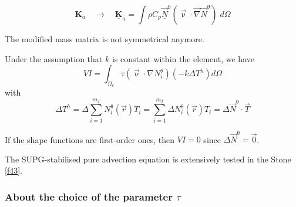\[
{\bm K}_a \quad \rightarrow  \quad \underline{\bm K}_a 
= \int \rho C_p \vec{\underline{N}}^\uptheta ({\vec \upnu}\cdot \vec\nabla \vec{N}^\uptheta) \; d\Omega
\]

\begin{remark} 
The modified mass matrix is not symmetrical anymore.
\end{remark} 

Under the assumption that $k$ is constant within the element, we have 
\[
VI = \int_{\Omega_e} \tau(\vec\upnu\cdot\nabla N_i^\theta)(- k \Delta T^h ) d\Omega 
\]
with 
\[
\Delta T^h 
= \Delta \sum_{i=1}^{m_T} N^\uptheta_i ({\vec r}) T_i 
=  \sum_{i=1}^{m_T} \Delta N^\uptheta_i ({\vec r}) T_i = \Delta \vec N^\uptheta \cdot \vec T
\]

\begin{remark}
If the shape functions are first-order ones, then $VI=0$ since $\Delta \vec N^\uptheta = \vec 0$.  
\end{remark}

The SUPG-stabilised pure advection equation is extensively tested in the Stone \ref{f43}.


\subsubsection{About the choice of the parameter $\tau$}\label{ss:tausupg}

